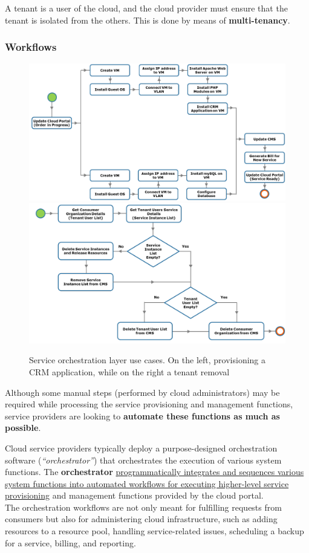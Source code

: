 \begin{definition}[Tenant] A tenant is a user of the cloud, and the cloud provider must ensure that the tenant is isolated from the others. This is done by means of \textbf{multi-tenancy}.
\end{definition}
\subsubsection*{Workflows}
\begin{figure}[htbp]
   \centering
   \includegraphics[width=0.45\columnwidth]{images/serviceorchestration1.png}
   \includegraphics[width=0.45\columnwidth]{images/serviceorchestration2.png}
   \caption{Service orchestration layer use cases. On the left, provisioning a CRM application, while on the right a tenant removal}
   \label{fig:serviceorchestration}
\end{figure}

Although some manual steps (performed by cloud administrators) may be
required while processing the service provisioning and management
functions, service providers are looking to \textbf{automate these
functions as much as possible}.

Cloud service providers typically deploy a purpose-designed orchestration software (\textit{``orchestrator''}) that orchestrates the execution of various system functions.
The \textbf{orchestrator} \ul{programmatically integrates and sequences various system functions into automated workflows for executing higher-level service provisioning} and management functions provided by the cloud portal.\\
The orchestration workflows are not only meant for fulfilling requests from consumers but also for administering cloud infrastructure, such as adding resources to a resource pool, handling service-related issues, scheduling a backup for a service, billing, and reporting.

